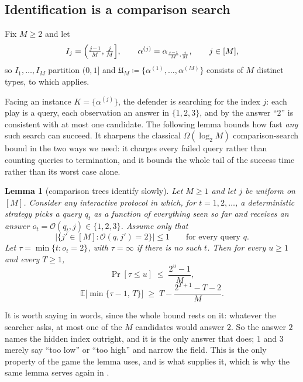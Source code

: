 \documentclass[letterpaper,9pt,twocolumn]{extarticle}
\newcommand{\EE}{\mathbb{E}}
\newcommand{\Univ}{\mathfrak{U}}
\theoremstyle{plain}
\newtheorem{lemma}[theorem]{Lemma}
\theoremstyle{definition}
\theoremstyle{remark}
\begin{document}
\subsection{Identification is a comparison search}
\label{sec:comparison}

Fix $M\ge 2$ and let
\begin{equation}
I_j=\Bigl(\tfrac{j-1}{M},\tfrac{j}{M}\Bigr],\qquad
\alpha^{(j)}=\alpha_{\frac{j-1}{M},\frac{j}{M}},\qquad j\in[M],
\label{eq:dyadic}
\end{equation}
so $I_1,\dots,I_M$ partition $(0,1]$ and
$\Univ_M\coloneqq\{\alpha^{(1)},\dots,\alpha^{(M)}\}$ consists of $M$
distinct types, to which  applies.

Facing an instance $K=\{\alpha^{(j)}\}$, the defender is searching for the
index $j$: each play is a query, each observation an answer in $\{1,2,3\}$,
and by  the answer ``$2$'' is consistent with at most one
candidate. The following lemma bounds how fast \emph{any} such search can
succeed. It sharpens the classical $\Omega(\log_2 M)$ comparison-search bound
in the two ways we need: it charges every failed query rather than counting
queries to termination, and it bounds the whole tail of the success time
rather than its worst case alone.

\begin{lemma}[comparison trees identify slowly]
\label{lem:count}
Let $M\ge 1$ and let $j$ be uniform on $[M]$. Consider any interactive
protocol in which, for $t=1,2,\dots$, a \emph{deterministic} strategy picks a
query $q_t$ as a function of everything seen so far and receives an answer
$o_t=\mathcal{O}(q_t,j)\in\{1,2,3\}$. Assume only that
\begin{equation}
\bigl|\{j'\in[M]:\mathcal{O}(q,j')=2\}\bigr|\le 1
\qquad\text{for every query } q .
\label{eq:one-hit}
\end{equation}
Let $\tau=\min\{t:o_t=2\}$, with $\tau=\infty$ if there is no such $t$. Then
for every $u\ge 1$ and every $T\ge 1$,
\begin{equation}
\Pr[\tau\le u]\;\le\;\frac{2^{u}-1}{M},
\label{eq:tau-tail}
\end{equation}
\begin{equation}
\EE\bigl[\min\{\tau-1,\,T\}\bigr]\;\ge\;T-\frac{2^{T+1}-T-2}{M}.
\label{eq:count-final}
\end{equation}
\end{lemma}

It is worth saying  in words, since the whole bound rests
on it: whatever the searcher asks, at most one of the $M$ candidates would
answer $2$. So the answer $2$ names the hidden index outright, and it is the
only answer that does; $1$ and $3$ merely say ``too low'' or ``too high'' and
narrow the field. This is the only property of the game the lemma uses, and
 is what supplies it, which is why the same lemma serves again
in .
\end{document}
